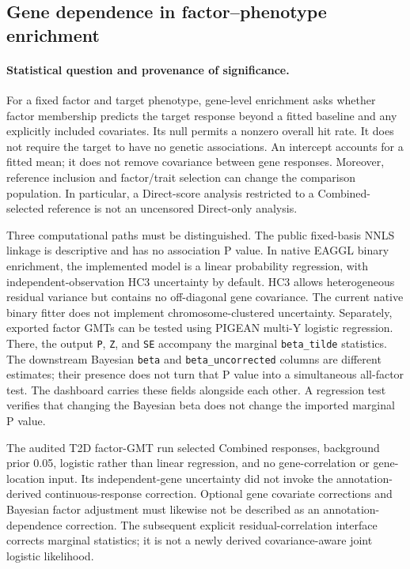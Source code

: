 \subsection{Gene dependence in factor--phenotype enrichment}
\label{sec:gene_dependence_robustness}

\paragraph{Statistical question and provenance of significance.}
For a fixed factor and target phenotype, gene-level enrichment asks whether factor membership predicts the target response beyond a fitted baseline and any explicitly included covariates. Its null permits a nonzero overall hit rate. It does not require the target to have no genetic associations. An intercept accounts for a fitted mean; it does not remove covariance between gene responses. Moreover, reference inclusion and factor/trait selection can change the comparison population. In particular, a Direct-score analysis restricted to a Combined-selected reference is not an uncensored Direct-only analysis.

Three computational paths must be distinguished. The public fixed-basis NNLS linkage is descriptive and has no association P value. In native EAGGL binary enrichment, the implemented model is a linear probability regression, with independent-observation HC3 uncertainty by default. HC3 allows heterogeneous residual variance but contains no off-diagonal gene covariance. The current native binary fitter does not implement chromosome-clustered uncertainty. Separately, exported factor GMTs can be tested using PIGEAN multi-Y logistic regression. There, the output \texttt{P}, \texttt{Z}, and \texttt{SE} accompany the marginal \texttt{beta\_tilde} statistics. The downstream Bayesian \texttt{beta} and \texttt{beta\_uncorrected} columns are different estimates; their presence does not turn that P value into a simultaneous all-factor test. The dashboard carries these fields alongside each other. A regression test verifies that changing the Bayesian beta does not change the imported marginal P value.

The audited T2D factor-GMT run selected Combined responses, background prior 0.05, logistic rather than linear regression, and no gene-correlation or gene-location input. Its independent-gene uncertainty did not invoke the annotation-derived continuous-response correction. Optional gene covariate corrections and Bayesian factor adjustment must likewise not be described as an annotation-dependence correction. The subsequent explicit residual-correlation interface corrects marginal statistics; it is not a newly derived covariance-aware joint logistic likelihood.


